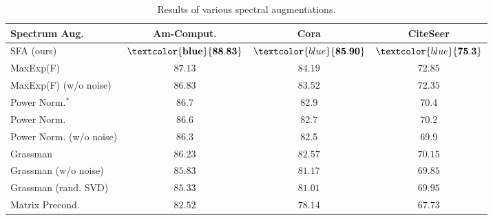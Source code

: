 \begin{table}[t]
\begin{minipage}[c]{0.42\textwidth}
{    \begin{tabular}{l|ccc}
    \toprule
    \textbf{Spectrum Aug}. & \textbf{Am-Comput.} & \textbf{Cora} & \textbf{CiteSeer} \\
    \midrule 
     \rowcolor{LightCyan}SFA (ours)  &$\mathbf{\textcolor{blue}{ 88.83}}$    &$\textcolor{blue}{\mathbf{85.90}}$   &$\textcolor{blue}{\mathbf{75.3}}$\\
    \midrule
    MaxExp(F)  &  $87.13$  & $84.19$   & $72.85$\\
    MaxExp(F) (w/o noise)        &  $86.83$  & $83.52$   & $72.35$\\
\midrule
     Power Norm.$^*$ & 86.7& 82.9      &  70.4 \\
     Power Norm. & 86.6& 82.7      &  70.2 \\
     Power Norm. (w/o noise) & 86.3 & 82.5      &  69.9 \\
    \midrule
     Grassman         &  $86.23$  & $82.57$   & $70.15$\\
    Grassman (w/o noise)                &  $85.83$  & $81.17$   & $69.85$\\
    Grassman (rand. SVD)                &  $85.33$  & $81.01$   & $69.95$\\
    \midrule
    Matrix Precond.    & $82.52$ & $78.14 $    &$67.73$     \\
    \bottomrule
    \end{tabular}
    }
    \vspace{-8px}
    \caption{Results of various spectral augmentations.$\!\!\!\!$\label{tab:spec_aug}}
    \vspace{-0.3cm}
\end{minipage}
\end{table}

